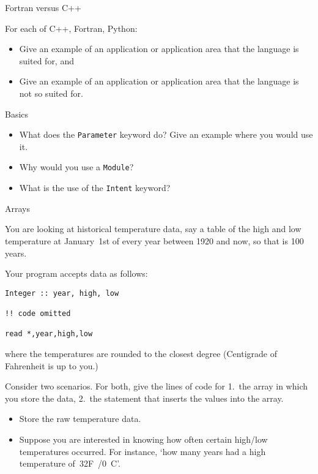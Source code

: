 

 {Fortran versus C++}

\begin{exercise}
  \label{ex:compare-language}
  For each of C++, Fortran, Python:
  \begin{itemize}
  \item Give an example of an application or application area that the
    language is suited for, and
  \item Give an example of an application or application area that the
    language is not so suited for.
  \end{itemize}
\end{exercise}

 {Basics}

\begin{exercise}
  \label{ex:f-whatfor}
  \begin{itemize}
  \item What does the \lstinline{Parameter} keyword do? Give an
    example where you would use it.
  \item Why would you use a \lstinline{Module}?
  \item What is the use of the \lstinline{Intent} keyword?
  \end{itemize}
\end{exercise}

 {Arrays}

\begin{exercise}
  \label{ex:ftemperature}
  You are looking at historical temperature data, say a table of the
  high and low temperature at January~1st of every year between 1920
  and now, so that is 100 years.

  Your program accepts data as follows:
\begin{lstlisting}
Integer :: year, high, low

!! code omitted

read *,year,high,low
\end{lstlisting}
  where the temperatures are rounded to the closest degree (Centigrade
  of Fahrenheit is up to you.)

Consider two scenarios. For both, 
  give the lines of code for 1.~the array in which you store the data,
  2.~the statement that inserts the values into the array.
  \begin{itemize}
  \item Store the raw temperature data.
  \item 
    Suppose you are interested in knowing how often certain high/low
    temperatures occurred. For instance, `how many years had a high
    temperature of~32F~/0~C'.
  \end{itemize}
\end{exercise}


